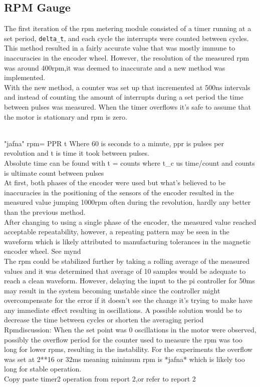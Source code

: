 \documentclass{article}
\begin{document}
\subsection{RPM Gauge}

The first iteration of the rpm metering module consisted of a timer running at a set period, \verb!delta_t!, and each cycle the interrupts were counted between cycles. This method resulted in a fairly accurate value that was mostly immune to inaccuracies in the encoder wheel. However, the resolution of the measured rpm was around 400rpm,it was deemed to inaccurate and a new method was implemented.
\\
With the new method, a counter was set up that incremented at 500ns intervals and instead of counting the amount of interrupts during a set period the time between pulses was measured. When the timer overflows it's safe to assume that the motor is stationary and rpm is zero. 

\\

"jafna" rpm=\frac{60\cdot} {PPR} \cdot t
Where 60 is seconds to a minute, ppr is pulses per revolution and t is time it took between pulses. 
\\
Absolute time can be found with t =  {counts}  where t_c us time/count and counts is ultimate count between pulses 
\\
At first, both phases of the encoder were used but what's believed to be inaccuracies in the positioning of the sensors of the encoder resulted in the measured value jumping 1000rpm often during the revolution, hardly any better than the previous method.
\\
After changing to using a single phase of the encoder, the measured value reached acceptable repeatability, however, a repeating pattern may be seen in the waveform which is  likely attributed to manufacturing tolerances in the magnetic encoder wheel. See mynd
\\
The rpm could be stabilized further by taking a rolling average of the measured values and it was determined that average of 10 samples would be adequate to reach a clean waveform. However, delaying the input to the pi controller for 50ms may result in the system becoming unstable since the controller might overcompensate for the error if it doesn't see the change it's trying to make have any immediate effect resulting in oscillations. A possible solution would be to decrease the time between cycles or shorten the averaging period
\\
Rpmdiscussion:
When the set point was 0 oscillations in the motor were observed, possibly the overflow period for the counter used to measure the rpm was too long for lower rpms, resulting in the instability. For the experiments the overflow was set at 2**16 or 32ms meaning minimum rpm is *jafna* which is likely too long for stable operation. 
\\
Copy paste timer2 operation from report 2,or refer to report 2
\end{document}
